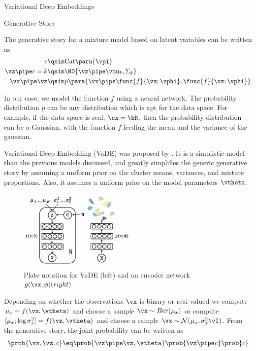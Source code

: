 \documentclass{article}
\begin{document}
\begin{psection}{Variational Deep Embeddings}

	\begin{algo}[0.9\textwidth]{Generative Story}

		The generative story for a mixture madel based on latent variables can be written as
		\begin{align*}
			c				&\qsim \text{Cat}\para{\vpi} \\
			\vz \pipe c = k	&\qsim \ND{\vz \pipe \vmu_k, \Sigma_k} \\
			\vx \pipe \vz	&\qsim p\para{\vx \pipe \func{f}{\vz; \vphi}, \func{f}{\vz; \vphi}}
		\end{align*}

		In our case, we model the function $f$ using a neural network. The probability distribution $p$ can be any distribution which is apt for the data space. For example, if the data space is real, \ie $\cx = \bR$, then the probability distribution can be a Gaussian, with the function $f$ feeding the mean and the variance of the gaussian.

	\end{algo}

	Variational Deep Embedding (VaDE) was proposed by \cite{vade}. It is a simplistic model than the previous models discussed, and greatly simplifies the generic generative story by assuming a uniform prior on the cluster means, variances, and misture proportions. Also, it assumes a uniform prior on the model parameters $\vtheta$.

	\begin{figure}[h]
		\centering
		\includegraphics[height=150px]{includes/vade.jpg}
		\caption{Plate notation for VaDE (left) and an encoder network $g(\vx; \phi) (right)$}
		\label{fig:my_label}
	\end{figure}

	Depending on whether the observations $\vx$ is binary or real-valued we compute $\mu_x = f(\vz, \vtheta)$ and choose a sample $\vx \sim Ber(\mu_x)$ or compute $[\mu_x;\log\sigma^2_x] = f(\vz,\vtheta)$ and choose a sample $\vx \sim \mathcal{N}(\mu_x,\sigma^2_x\vI)$. From the generative story, the joint probability can be written as
	\begin{align*}
		\prob{\vx, \vz, c} \eq \prob{\vx \pipe \vz, \vtheta} \prob{\vz \pipe c} \prob{c}
	\end{align*}


\end{psection}
\end{document}
